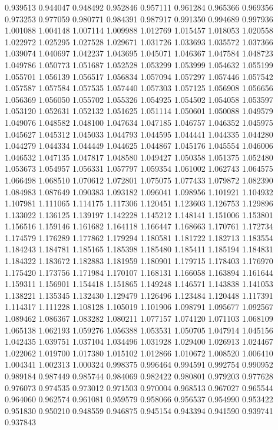 0.939513
0.944047
0.948492
0.952846
0.957111
0.961284
0.965366
0.969356
0.973253
0.977059
0.980771
0.984391
0.987917
0.991350
0.994689
0.997936
1.001088
1.004148
1.007114
1.009988
1.012769
1.015457
1.018053
1.020558
1.022972
1.025295
1.027528
1.029671
1.031726
1.033693
1.035572
1.037366
1.039074
1.040697
1.042237
1.043695
1.045071
1.046367
1.047584
1.048723
1.049786
1.050773
1.051687
1.052528
1.053299
1.053999
1.054632
1.055199
1.055701
1.056139
1.056517
1.056834
1.057094
1.057297
1.057446
1.057542
1.057587
1.057584
1.057535
1.057440
1.057303
1.057125
1.056908
1.056656
1.056369
1.056050
1.055702
1.055326
1.054925
1.054502
1.054058
1.053597
1.053120
1.052631
1.052132
1.051625
1.051114
1.050601
1.050088
1.049579
1.049076
1.048582
1.048100
1.047634
1.047185
1.046757
1.046352
1.045975
1.045627
1.045312
1.045033
1.044793
1.044595
1.044441
1.044335
1.044280
1.044279
1.044334
1.044449
1.044625
1.044867
1.045176
1.045554
1.046006
1.046532
1.047135
1.047817
1.048580
1.049427
1.050358
1.051375
1.052480
1.053673
1.054957
1.056331
1.057797
1.059354
1.061002
1.062743
1.064575
1.066498
1.068510
1.070612
1.072801
1.075075
1.077433
1.079872
1.082390
1.084983
1.087649
1.090383
1.093182
1.096041
1.098956
1.101921
1.104932
1.107981
1.111065
1.114175
1.117306
1.120451
1.123603
1.126753
1.129896
1.133022
1.136125
1.139197
1.142228
1.145212
1.148141
1.151006
1.153801
1.156516
1.159146
1.161682
1.164118
1.166447
1.168663
1.170761
1.172734
1.174579
1.176289
1.177862
1.179294
1.180581
1.181722
1.182713
1.183554
1.184243
1.184781
1.185165
1.185398
1.185480
1.185411
1.185194
1.184831
1.184322
1.183672
1.182883
1.181959
1.180901
1.179715
1.178403
1.176970
1.175420
1.173756
1.171984
1.170107
1.168131
1.166058
1.163894
1.161644
1.159311
1.156901
1.154418
1.151865
1.149248
1.146571
1.143838
1.141053
1.138221
1.135345
1.132430
1.129479
1.126496
1.123484
1.120448
1.117391
1.114317
1.111228
1.108128
1.105019
1.101906
1.098791
1.095677
1.092567
1.089462
1.086367
1.083282
1.080211
1.077157
1.074120
1.071103
1.068109
1.065138
1.062193
1.059276
1.056388
1.053531
1.050705
1.047914
1.045156
1.042435
1.039751
1.037104
1.034496
1.031928
1.029400
1.026913
1.024467
1.022062
1.019700
1.017380
1.015102
1.012866
1.010672
1.008520
1.006410
1.004341
1.002313
1.000324
0.998375
0.996464
0.994591
0.992754
0.990952
0.989184
0.987449
0.985744
0.984069
0.982422
0.980801
0.979203
0.977628
0.976073
0.974535
0.973012
0.971503
0.970004
0.968513
0.967027
0.965544
0.964060
0.962574
0.961081
0.959579
0.958066
0.956537
0.954990
0.953422
0.951830
0.950210
0.948559
0.946875
0.945154
0.943394
0.941590
0.939741
0.937843
